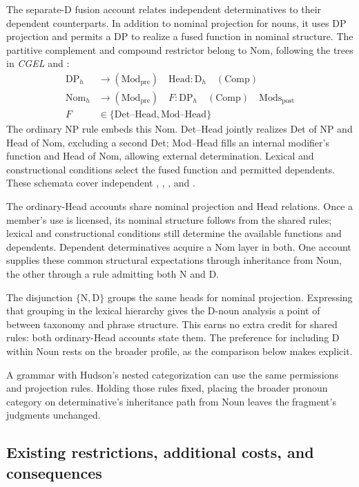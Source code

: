 \documentclass[12pt]{article}
\begin{document}
The separate-D fusion account relates independent determinatives to their dependent counterparts. In addition to nominal projection for nouns, it uses DP projection and permits a DP to realize a fused function in nominal structure. The partitive complement and compound restrictor belong to Nom, following the trees in \textit{CGEL} and \textcite[582]{Payne2007}:
\[
\begin{aligned}
\mathrm{DP}_{h} &\to (\mathrm{Mod}_{\mathrm{pre}})\quad \mathrm{Head}:\mathrm{D}_{h}\quad (\mathrm{Comp}) \\
\mathrm{Nom}_{h} &\to (\mathrm{Mod}_{\mathrm{pre}})\quad F:\mathrm{DP}_{h}\quad (\mathrm{Comp})\quad \mathrm{Mods}_{\mathrm{post}} \\
F&\in\{\mathrm{Det\text{--}Head},\mathrm{Mod\text{--}Head}\}
\end{aligned}
\]
The ordinary NP rule embeds this Nom. Det--Head jointly realizes Det of NP and Head of Nom, excluding a second Det; Mod--Head fills an internal modifier's function and Head of Nom, allowing external determination. Lexical and constructional conditions select the fused function and permitted dependents. These schemata cover independent , , , and .

The ordinary-Head accounts share nominal projection and Head relations. Once a member's use is licensed, its nominal structure follows from the shared rules; lexical and constructional conditions still determine the available functions and dependents. Dependent determinatives acquire a Nom layer in both. One account supplies these common structural expectations through inheritance from Noun, the other through a rule admitting both N and D.

The disjunction $\{\mathrm{N},\mathrm{D}\}$ groups the same heads for nominal projection. Expressing that grouping in the lexical hierarchy gives the D-noun analysis a point of  between taxonomy and phrase structure. This earns no extra credit for shared rules: both ordinary-Head accounts state them. The preference for including D within Noun rests on the broader profile, as the comparison below makes explicit.

A grammar with Hudson's nested categorization can use the same permissions and projection rules. Holding those rules fixed, placing the broader pronoun category on determinative's inheritance path from Noun leaves the fragment's judgments unchanged.

\subsection{Existing restrictions, additional costs, and consequences}\label{sec:costs}
\end{document}

